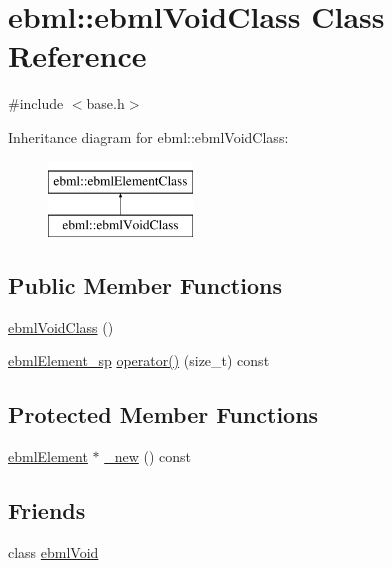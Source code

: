 \hypertarget{classebml_1_1ebmlVoidClass}{}\section{ebml\+:\+:ebml\+Void\+Class Class Reference}
\label{classebml_1_1ebmlVoidClass}


{\ttfamily \#include $<$base.\+h$>$}

Inheritance diagram for ebml\+:\+:ebml\+Void\+Class\+:\begin{figure}[H]
\begin{center}
\leavevmode
\includegraphics[height=2.000000cm]{classebml_1_1ebmlVoidClass}
\end{center}
\end{figure}
\subsection*{Public Member Functions}
\begin{DoxyCompactItemize}
\item 
\mbox{\hyperlink{classebml_1_1ebmlVoidClass_afc8666d6bbcd41bad76bfc5a2b5b4c9a}{ebml\+Void\+Class}} ()
\item 
\mbox{\hyperlink{namespaceebml_adad533b7705a16bb360fe56380c5e7be}{ebml\+Element\+\_\+sp}} \mbox{\hyperlink{classebml_1_1ebmlVoidClass_ad570c8614bf8fc88edecbbe0d3a335e6}{operator()}} (size\+\_\+t) const
\end{DoxyCompactItemize}
\subsection*{Protected Member Functions}
\begin{DoxyCompactItemize}
\item 
\mbox{\hyperlink{classebml_1_1ebmlElement}{ebml\+Element}} $\ast$ \mbox{\hyperlink{classebml_1_1ebmlVoidClass_a8852efa478e785ae70b4fce60f67e6f7}{\+\_\+new}} () const
\end{DoxyCompactItemize}
\subsection*{Friends}
\begin{DoxyCompactItemize}
\item 
class \mbox{\hyperlink{classebml_1_1ebmlVoidClass_af2d556fe3de73937062cdd59bad2a1c0}{ebml\+Void}}
\end{DoxyCompactItemize}
